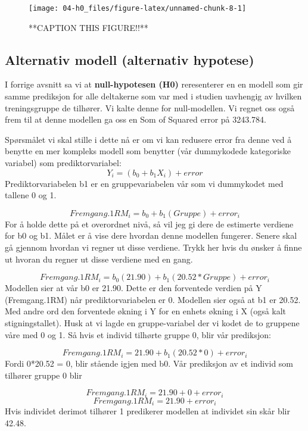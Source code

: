 \documentclass[
]{book}
\begin{document}
\begin{figure}

{\centering \texttt{[image: 04-h0\_files/figure-latex/unnamed-chunk-8-1]} 

}

\caption{**CAPTION THIS FIGURE!!**}\label{fig:unnamed-chunk-8}
\end{figure}

\hypertarget{alternativ-modell-alternativ-hypotese}{%
\subsection{Alternativ modell (alternativ hypotese)}\label{alternativ-modell-alternativ-hypotese}}

I forrige avsnitt sa vi at \textbf{null-hypotesen (H0)} reresenterer en en modell som gir samme prediksjon for alle deltakerne som var med i studien uavhengig av hvilken treningsgruppe de tilhører. Vi kalte denne for null-modellen. Vi regnet oss også frem til at denne modellen ga oss en Som of Squared error på 3243.784.

Spørsmålet vi skal stille i dette nå er om vi kan redusere error fra denne ved å benytte en mer kompleks modell som benytter (vår dummykodede kategoriske variabel) som prediktorvariabel:
\[
Y_i = (b_0 + b_1X_i) + error
\]
Prediktorvariabelen b1 er en gruppevariabelen vår som vi dummykodet med tallene 0 og 1.

\[
Fremgang.1RM_i = b_0 + b_1(Gruppe) + error_i
\]
For å holde dette på et overordnet nivå, så vil jeg gi dere de estimerte verdiene for b0 og b1. Målet er å vise dere hvordan denne modellen fungerer. Senere skal gå gjennom hvordan vi regner ut disse verdiene. Trykk her hvis du ønsker å finne ut hvoran du regner ut disse verdiene med en gang.

\[
Fremgang.1RM_i = b_0(21.90) + b_1(20.52*Gruppe) + error_i
\]
Modellen sier at vår b0 er 21.90. Dette er den forventede verdien på Y (Fremgang.1RM) når prediktorvariabelen er 0. Modellen sier også at b1 er 20.52. Med andre ord den forventede økning i Y for en enhets økning i X (også kalt stigningstallet). Husk at vi lagde en gruppe-variabel der vi kodet de to gruppene våre med 0 og 1. Så hvis et individ tilhørte gruppe 0, blir vår prediksjon:

\[
Fremgang.1RM_i = 21.90 + b_1(20.52*0) + error_i
\]
Fordi 0*20.52 = 0, blir stående igjen med b0. Vår prediksjon av et individ som tilhører gruppe 0 blir

\[
Fremgang.1RM_i = 21.90 + 0 + error_i
\]
\[
Fremgang.1RM_i = 21.90 + error_i
\]
Hvis individet derimot tilhører 1 predikerer modellen at individet sin skår blir 42.48.
\end{document}
